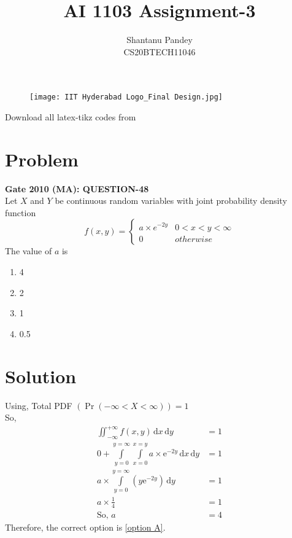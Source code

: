 \documentclass[journal,12pt,twocolumn]{IEEEtran}
\title{AI 1103 Assignment-3}
\author{Shantanu Pandey\\ CS20BTECH11046}
\date{}
\providecommand{\pr}[1]{\ensuremath{\Pr\left(#1\right)}}
\providecommand{\brak}[1]{\ensuremath{\left(#1\right)}}
\begin{document}
\maketitle
\noindent

\begin{figure} [h]
    \texttt{[image: IIT Hyderabad Logo\_Final Design.jpg]}
\end{figure}
\vspace{0.3cm}

Download all latex-tikz codes from  

\vspace{0.3cm}  
    
   
\vspace{0.5cm}
\section*{Problem}
\textbf{ Gate 2010 (MA): QUESTION-48} \\
Let $X$ and $Y$ be continuous random variables with joint probability density function 
\begin{equation*}
    f\brak{x,y}= \begin{cases} 
      a\times e^{-2y} & 0 < x < y <\infty  \\
       0 & otherwise
   \end{cases}
\end{equation*}
The value of $a$ is
\begin{enumerate}[label=(\Alph*)]
\item 4 \label{option A}
\item 2
\item 1
\item  0.5
\end{enumerate} 



\section*{Solution}
Using, Total PDF $(\pr{-\infty < X < \infty})=1$  \\
So,
\begin{align}
\iint_{-\infty}^{+\infty}  f(x,y) \, \mathrm{d}x \, \mathrm{d}y &= 1 \\
 0 + \int \limits_{y=0}^{y=\infty} \int \limits_{x=0}^{x=y} a \times \mathrm{e}^{-2y} \, \mathrm{d}x\, \mathrm{d}y  &= 1 \\
  a \times \int \limits_{y=0}^{y=\infty}  \brak{y\mathrm{e}^{-2y} } \, \mathrm{d}y &= 1 \\
a \times \frac{1}{4} &= 1 \\
\text{So,  } a &= 4
\end{align}
 Therefore, the correct option is \ref{option A}.  

\end{document}

